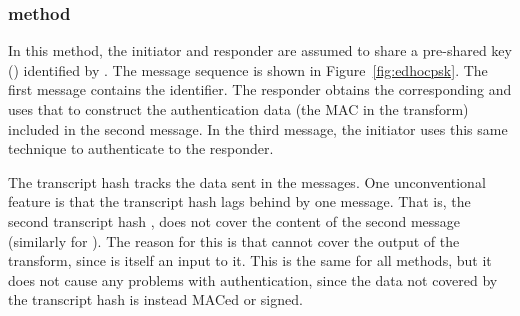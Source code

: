 \subsubsection{\mPskPsk{} method}
In this method, the initiator and responder are assumed to share a pre-shared key (\mPsk) identified by \mIDPsk.
%
The message sequence is shown in Figure~\ref{fig:edhocpsk}.
%
The first message contains the \mIDPsk{} identifier.
%
The responder obtains the corresponding \mPsk{} and uses that to construct the authentication data (the MAC in the \mAead{} transform) included in the second message.
%
%
In the third message, the initiator uses this same technique to authenticate to the responder.
%

The transcript hash \mTH{} tracks the data sent in the messages.
%
One unconventional feature is that the transcript hash lags behind by one message. That is, the second transcript hash \mTHtwo{}, does not cover the content of the second message (similarly for \mTHthree). The reason for this is that \mTHtwo{} cannot cover the output of the \mAead{} transform, since \mTHtwo{} is itself an input to it.
%
This is the same for all methods, but it does not cause any problems with authentication, since the data not covered by the transcript hash is instead MACed or signed.
%

